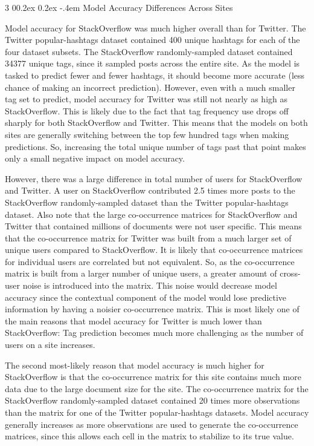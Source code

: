 \documentclass[man,floatsintext,donotrepeattitle]{apa6}
\makeatletter
\renewcommand{\subsubsection}{%
  \@startsection
  {subsubsection}%
  {3}%
  {\parindent}%
  {0\baselineskip \@plus 0.2ex \@minus 0.2ex}%
  {-.4em}%
  {\normalfont\normalsize\bfseries\addperi}}
\makeatother
\begin{document}
\subsubsection{Model Accuracy Differences Across Sites}

Model accuracy for StackOverflow was much higher overall than for Twitter.
The Twitter popular-hashtags dataset contained 400 unique hashtags for each of the four dataset subsets.
The StackOverflow randomly-sampled dataset contained \num{34377} unique tags, since it sampled posts across the entire site.
As the model is tasked to predict fewer and fewer hashtags, it should become more accurate (less chance of making an incorrect prediction).
However, even with a much smaller tag set to predict, model accuracy for Twitter was still not nearly as high as StackOverflow.
This is likely due to the fact that tag frequency use drops off sharply for both StackOverflow and Twitter.
This means that the models on both sites are generally switching between the top few hundred tags when making predictions.
So, increasing the total unique number of tags past that point makes only a small negative impact on model accuracy.

However, there was a large difference in total number of users for StackOverflow and Twitter.
A user on StackOverflow contributed 2.5 times more posts to the StackOverflow randomly-sampled dataset than the Twitter popular-hashtags dataset.
Also note that the large co-occurrence matrices for StackOverflow and Twitter that contained millions of documents were not user specific.
This means that the co-occurrence matrix for Twitter was built from a much larger set of unique users compared to StackOverflow.
It is likely that co-occurrence matrices for individual users are correlated but not equivalent.
So, as the co-occurrence matrix is built from a larger number of unique users, a greater amount of cross-user noise is introduced into the matrix.
This noise would decrease model accuracy since the contextual component of the model would lose predictive information by having a noisier co-occurrence matrix.
This is most likely one of the main reasons that model accuracy for Twitter is much lower than StackOverflow:
Tag prediction becomes much more challenging as the number of users on a site increases.

The second most-likely reason that model accuracy is much higher for StackOverflow is that the co-occurrence matrix for this site contains much more data due to the large document size for the site.
The co-occurrence matrix for the StackOverflow randomly-sampled dataset contained 20 times more observations than the matrix for one of the Twitter popular-hashtags datasets.
Model accuracy generally increases as more observations are used to generate the co-occurrence matrices, since this allows each cell in the matrix to stabilize to its true value.
\end{document}
